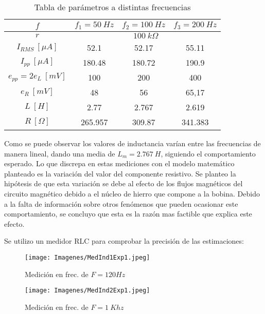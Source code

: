 \begin{table}[H]
    \centering
    \begin{tabular}{|c|c|c|c|}
    \hline
        $f$ & $f_1 = 50~Hz$ & $f_2 = 100~Hz$ & $f_3 = 200~Hz$ \\
    \hline
        $r$ & \multicolumn{3}{c|}{$100~k\Omega$}\\
    \hline
        $I_{RMS}~[\mu A]$ & 52.1 & 52.17 & 55.11\\
        $I_{pp}~[\mu A]$ & 180.48 & 180.72 & 190.9\\
        $e_{pp} = 2 e_L ~[mV]$ & 100 & 200 & 400  \\
        $e_R~[mV]$ & 48 & 56 & 65,17 \\
        $L~[H]$ & 2.77 & 2.767 & 2.619 \\
        $R~[\Omega]$ & 265.957 & 309.87 & 341.383 \\
    \hline    
    
        \end{tabular}
        \def\tablename{Tabla} 
        \caption{Tabla de parámetros a distintas frecuencias}
        \label{tab:exp1}
\end{table}

Como se puede observar los valores de inductancia varían entre las frecuencias de manera lineal, dando una media de $L_m=2.767~H$, siguiendo el comportamiento esperado. Lo que discrepa en estas mediciones con el modelo matemático planteado  es la variación del valor del componente resistivo. Se planteo la hipótesis de que esta variación se debe al efecto de los flujos magnéticos del circuito magnético debido a el núcleo de hierro que compone a la bobina. Debido a la falta de información sobre otros fenómenos que pueden ocasionar este comportamiento, se concluyo que esta es la razón mas factible que explica este efecto.

Se utilizo un medidor RLC para comprobar la precisión de las estimaciones:
\begin{figure}[H]
    \begin{minipage}{0.49\textwidth}
    \centering
    \texttt{[image: Imagenes/MedInd1Exp1.jpeg]}
    \caption{Medición en frec. de $F=120 Hz$}
    \end{minipage}
    \begin{minipage}{0.49\textwidth}
    \centering
    \texttt{[image: Imagenes/MedInd2Exp1.jpeg]}
    \caption{Medición en frec. de $F=1~Khz$}
    \end{minipage}
\end{figure}